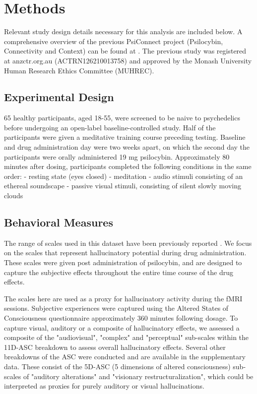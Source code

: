 \documentclass{article}
\begin{document}
\section{Methods}
\label{sec:headings}

Relevant study design details necessary for this analysis are included below. A comprehensive overview of the previous PsiConnect project (Psilocybin, Connectivity and Context) can be found at \cite{novelli_psiconnect_2025, stoliker_psychedelics_2025}. The previous study was registered at anzctr.org.au (ACTRN126210013758) and approved by the Monash University Human Research Ethics Committee (MUHREC). 

\subsection{Experimental Design}

65 healthy participants, aged 18-55, were screened to be naive to psychedelics before undergoing an open-label baseline-controlled study. Half of the participants were given a meditative training course preceding testing. Baseline and drug administration day were two weeks apart, on which the second day the participants were orally administered 19 mg psilocybin. Approximately 80 minutes after dosing, participants completed the following conditions in the same order:  
- resting state (eyes closed)
- meditation
- audio stimuli consisting of an ethereal soundscape 
- passive visual stimuli, consisting of silent slowly moving clouds

\subsection{Behavioral Measures}

The range of scales used in this dataset have been previously reported \citep{novelli_psiconnect_2025}. We focus on the scales that represent hallucinatory potential during drug administration. These scales were given post administration of psilocybin, and are designed to capture the subjective effects throughout the entire time course of the drug effects. 

The scales here are used as a proxy for hallucinatory activity during the fMRI sessions. Subjective experiences were captured using the Altered States of Consciousness questionnaire approximately 360 minutes following dosage. To capture visual, auditory or a composite of hallucinatory effects, we assessed a composite of the "audiovisual", "complex" and "perceptual" sub-scales within the 11D-ASC breakdown to assess overall hallucinatory effects. Several other breakdowns of the ASC were conducted and are available in the supplementary data. These consist of the 5D-ASC (5 dimensions of altered consciousness) sub-scales of "auditory alterations" and "visionary restructuralization", which could be interpreted as proxies for purely auditory or visual hallucinations.  
\end{document}
